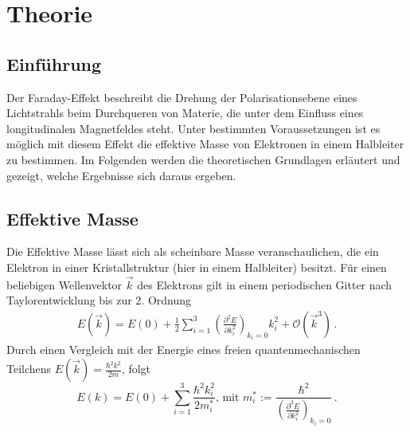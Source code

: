\section{Theorie}
\label{sec:Theorie}

\subsection{Einführung}
Der Faraday-Effekt beschreibt die Drehung der Polarisationsebene eines Lichtstrahls beim Durchqueren von Materie, die unter dem Einfluss eines longitudinalen Magnetfeldes steht.
Unter bestimmten Voraussetzungen ist es möglich mit diesem Effekt die effektive Masse von Elektronen in einem Halbleiter zu bestimmen.
Im Folgenden werden die theoretischen Grundlagen erläutert und gezeigt, welche Ergebnisse sich daraus ergeben.
\subsection{Effektive Masse}
Die Effektive Masse lässt sich als scheinbare Masse veranschaulichen, die ein Elektron in einer Kristallstruktur (hier in einem Halbleiter) besitzt. Für einen beliebigen Wellenvektor $\vec{k}$ des Elektrons gilt in einem periodischen Gitter nach Taylorentwicklung bis zur 2. Ordnung
\begin{align*}
	E(\vec{k})=E(0)+\frac{1}{2}\sum_{i=1}^3\left(\frac{\partial^2 E}{\partial k_i^2}\right)_{k_i=0}k_i^2+\mathcal{O}(\vec{k}^3) \, \mathrm{.}
\end{align*}
Durch einen Vergleich mit der Energie eines freien quantenmechanischen Teilchens $E(\vec{k})=\frac{\hbar^2k^2}{2m}$, folgt
\begin{equation}
	E(k)=E(0)+\sum_{i=1}^3\frac{\hbar^2k_i^2}{2m_i^*}\text{, mit }m_i^*:=\frac{\hbar^2}{\left(\frac{\partial^2 E}{\partial k_i^2}\right)_{k_i=0}} \, \mathrm{.}
\end{equation}
